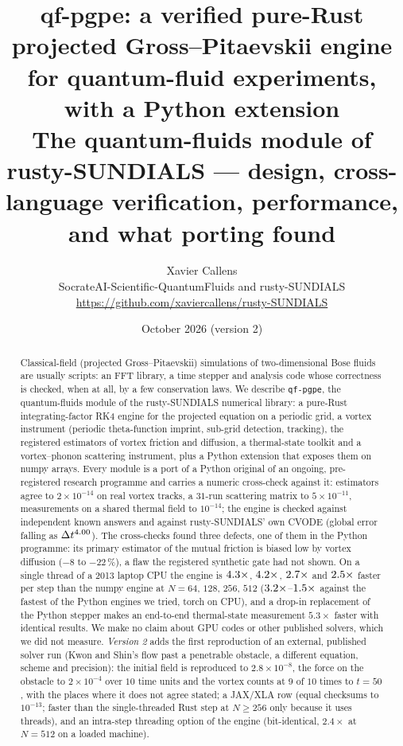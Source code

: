 \documentclass[11pt,a4paper]{article}
\title{\textbf{qf-pgpe: a verified pure-Rust projected Gross--Pitaevskii engine for quantum-fluid experiments, with a Python extension}\\
\large The quantum-fluids module of rusty-SUNDIALS --- design, cross-language verification, performance, and what porting found}
\author{Xavier Callens\\ \small SocrateAI-Scientific-QuantumFluids and rusty-SUNDIALS\\
\small \url{https://github.com/xaviercallens/rusty-SUNDIALS}}
\date{October 2026 (version 2)}
\begin{document}
\maketitle

\begin{abstract}\noindent
Classical-field (projected Gross--Pitaevskii) simulations of two-dimensional Bose fluids are usually scripts: an FFT library, a time stepper and
analysis code whose correctness is checked, when at all, by a few conservation laws. We describe \texttt{qf-pgpe}, the quantum-fluids module of
the rusty-SUNDIALS numerical library: a pure-Rust integrating-factor RK4 engine for the projected equation on a periodic grid, a vortex
instrument (periodic theta-function imprint, sub-grid detection, tracking), the registered estimators of vortex friction and diffusion, a thermal-state
toolkit and a vortex--phonon scattering instrument, plus a Python extension that exposes them on numpy arrays. Every module is a port of a
Python original of an ongoing, pre-registered research programme and carries a numeric cross-check against it: estimators agree to $2\times10^{-14}$
on real vortex tracks, a $31$-run scattering matrix to $5\times10^{-11}$, measurements on a shared thermal field to $10^{-14}$; the engine is checked against
independent known answers and against rusty-SUNDIALS' own CVODE (global error falling as $\Delta t^{4.00}$). The cross-checks found three defects,
one of them in the Python programme: its primary estimator of the mutual friction is biased low by vortex diffusion ($-8$ to $-22\,\%$), a flaw the
registered synthetic gate had not shown. On a single thread of a 2013 laptop CPU the engine is $4.3\times$, $4.2\times$, $2.7\times$ and $2.5\times$ faster per step than the
numpy engine at $N=64$, $128$, $256$, $512$ ($3.2\times$--$1.5\times$ against the fastest of the Python engines we tried, torch on CPU), and a drop-in replacement of the
Python stepper makes an end-to-end thermal-state measurement $5.3\times$ faster with identical results. We make no claim about GPU codes or other
published solvers, which we did not measure. \emph{Version 2} adds the first reproduction of an external, published solver run
(Kwon and Shin's flow past a penetrable obstacle, a different equation, scheme and precision): the initial field is reproduced to $2.8\times10^{-8}$,
the force on the obstacle to $2\times10^{-4}$ over $10$ time units and the vortex counts at $9$ of $10$ times to $t=50$, with the places where it does not agree stated;
a JAX/XLA row (equal checksums to $10^{-13}$; faster than the single-threaded Rust step at $N\ge256$ only because it uses threads), and an intra-step threading option of the engine (bit-identical, $2.4\times$ at $N=512$ on a loaded machine).
\end{abstract}
\end{document}
